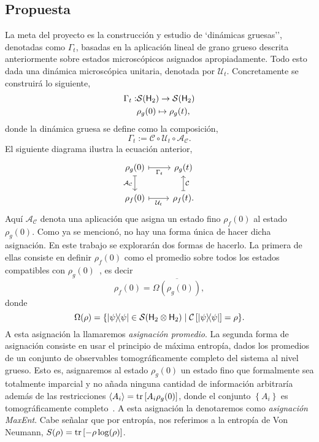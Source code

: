 \documentclass[10pt]{article}
\newcommand{\mcU}{\mathcal{U}}
\newcommand{\mcS}{\mathcal{S}}
\newcommand{\hilbert}{{\sf H}}
\newcommand{\mcC}{\mathcal{C}}
\newcommand{\mcA}{\mathcal{A}}
\begin{document}
\subsection{Propuesta}
La meta del proyecto es la construcción y estudio de `dinámicas gruesas'', denotadas como $\Gamma_t$, basadas en la aplicación lineal de grano grueso descrita anteriormente sobre estados microscópicos asignados apropiadamente. Todo esto dada una dinámica microscópica unitaria, denotada por $\mcU_t$. Concretamente se construirá lo siguiente,
\begin{align*}
\Gamma_{t}:&\mcS(\hilbert_2)\rightarrow \mcS(\hilbert_2)\\
&\rho_g(0) \mapsto \rho_g(t),
\end{align*}
donde la dinámica gruesa se define como la composición,
\begin{equation*}
\Gamma_t:=\mcC \circ \mcU_t \circ \mcA_\mcC.
\end{equation*}
El siguiente diagrama ilustra la ecuación anterior,
\[\begin{tikzcd}[arrows={<-|}]
\rho_{g}(0)  & \rho_{g}(t) \arrow{l}{\Gamma_{t}} \arrow{d}{\mcC}\\
\rho_{f}(0) \arrow{u}{\mcA_{\mcC}} & \rho_{f}(t). \arrow{l}{\mcU_{t}}
\end{tikzcd}
\]
Aquí $\mcA_\mcC$ denota una aplicación que asigna un estado fino $\rho_f(0)$ al estado $\rho_g(0)$. Como ya se mencionó, no hay una forma única de hacer dicha asignación. En este trabajo se explorarán dos formas de hacerlo. La primera de ellas consiste en definir $\rho_f(0)$ como el promedio sobre todos los estados compatibles con $\rho_g(0)$~\cite{Macro-To-Micro}, es decir
$$\rho_f(0)=\overline{\Omega(\rho_g(0))},$$
donde
\begin{equation*}
\Omega(\rho)=\{\dyad{\psi}\in \mcS(\hilbert_2 \otimes \hilbert_2) \mid \mcC\left[\dyad{\psi}\right]=\rho\}.
\end{equation*}
A esta asignación la llamaremos \textit{asignación promedio}. La segunda forma de asignación consiste en usar el principio de máxima entropía, dados los promedios de un conjunto de observables tomográficamente completo del sistema al nivel grueso. Esto es, asignaremos al estado $\rho_g(0)$ un estado fino que formalmente sea totalmente imparcial y no añada ninguna cantidad de información arbitraría además de las restricciones $\langle A_i \rangle=\tr \left[ A_i \rho_g(0) \right]$, donde el conjunto $\left\{A_i \right\}$ es tomográficamente completo~\cite{jaynes}. A esta asignación la denotaremos como \textit{asignación MaxEnt}. Cabe señalar que por entropía, nos referimos a la entropía de Von Neumann, $S(\rho)=\tr \left[ -\rho \log(\rho) \right]$.
\end{document}
